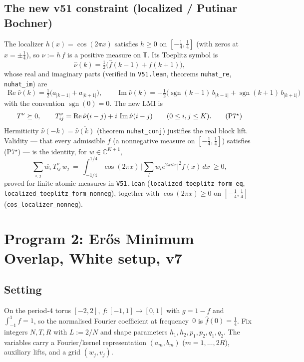 \documentclass[11pt]{article}
\newcommand{\C}{\mathbb{C}}
\newcommand{\T}{\mathbb{T}}
\newcommand{\re}{\operatorname{Re}}
\newcommand{\im}{\operatorname{Im}}
\newcommand{\sgn}{\operatorname{sgn}}
\newcommand{\psdge}{\succeq 0}
\begin{document}
\subsection*{The new v51 constraint (localized / Putinar Bochner)}
The localizer $h(x)=\cos(2\pi x)$ satisfies $h\ge 0$ on $[-\tfrac14,\tfrac14]$
(with zeros at $x=\pm\tfrac14$), so $\nu:=h\,f$ is a positive measure on $\T$.
Its Toeplitz symbol is
\[
  \hat\nu(k)=\tfrac12\bigl(\hat f(k-1)+\hat f(k+1)\bigr),
\]
whose real and imaginary parts (verified in \texttt{V51.lean}, theorems
\texttt{nuhat\_re}, \texttt{nuhat\_im}) are
\[
\boxed{\ \re\hat\nu(k)=\tfrac12\bigl(a_{|k-1|}+a_{|k+1|}\bigr),\qquad
 \im\hat\nu(k)=-\tfrac12\bigl(\sgn(k-1)\,b_{|k-1|}+\sgn(k+1)\,b_{|k+1|}\bigr)\ }
\]
with the convention $\sgn(0)=0$. The new LMI is
\begin{equation}
 T^{\nu}\psdge,\qquad
 T^{\nu}_{ij}=\re\hat\nu(i-j)+i\,\im\hat\nu(i-j)\qquad(0\le i,j\le K). \tag{P7$^{\star}$}
\end{equation}
Hermiticity $\hat\nu(-k)=\overline{\hat\nu(k)}$ (theorem \texttt{nuhat\_conj})
justifies the real block lift. Validity — that every admissible $f$ (a
nonnegative measure on $[-\tfrac14,\tfrac14]$) satisfies (P7$^\star$) — is the
identity, for $w\in\C^{K+1}$,
\[
 \sum_{i,j} \overline{w_i}\,T^{\nu}_{ij}\,w_j
 \ =\ \int_{-1/4}^{1/4}\!\cos(2\pi x)\,\Big|\sum_{l} w_l e^{2\pi i l x}\Big|^2 f(x)\,dx\ \ge 0,
\]
proved for finite atomic measures in \texttt{V51.lean}
(\texttt{localized\_toeplitz\_form\_eq}, \texttt{localized\_toeplitz\_form\_nonneg}),
together with $\cos(2\pi x)\ge 0$ on $[-\tfrac14,\tfrac14]$
(\texttt{cos\_localizer\_nonneg}).

\section{Program 2: Er\H{o}s Minimum Overlap, White setup, v7}

\subsection*{Setting}
On the period-$4$ torus $[-2,2]$, $f:[-1,1]\to[0,1]$ with $g=1-f$ and
$\int_{-1}^{1} f = 1$, so the normalised Fourier coefficient at frequency~$0$
is $\hat f(0)=\tfrac14$. Fix integers $N,T,R$ with $L:=2/N$ and shape
parameters $h_1,h_2,p_1,p_2,q_1,q_2$. The variables carry a Fourier/kernel
representation $(a_m,b_m)$ ($m=1,\dots,2R$), auxiliary lifts, and a
grid $(w_j,v_j)$.
\end{document}
